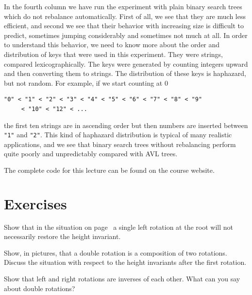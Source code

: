 In the fourth column we have run the experiment with plain binary
search trees which do not rebalance automatically.  First of all, we
see that they are much less efficient, and second we see that their
behavior with increasing size is difficult to predict, sometimes
jumping considerably and sometimes not much at all.  In order to
understand this behavior, we need to know more about the order and
distribution of keys that were used in this experiment.  They were
strings, compared lexicographically.  The keys were generated by
counting integers upward and then converting them to strings.  The
distribution of these keys is haphazard, but not random.  For example,
if we start counting at $0$
\begin{lstlisting}[language={[C0]C}]
"0" < "1" < "2" < "3" < "4" < "5" < "6" < "7" < "8" < "9"
     < "10" < "12" < ...
\end{lstlisting}
the first ten strings are in ascending order but then numbers
are inserted between \lstinline'"1"' and \lstinline'"2"'.  This kind of
haphazard distribution is typical of many realistic applications,
and we see that binary search trees without rebalancing perform
quite poorly and unpredictably compared with AVL trees.

\bigskip

The complete code for this lecture can be found on the course website.

\section{Exercises}
\label{sec:avl:exercises}

\begin{exercise}
\label{exc:left-not-restore}
Show that in the situation on page~\pageref{dia:RL} a single
left rotation at the root will not necessarily restore the
height invariant.
\end{exercise}

\begin{exercise}
\label{exc:double-rotation}
Show, in pictures, that a double rotation is a composition
of two rotations.  Discuss the situation with respect to the
height invariants after the first rotation.
\end{exercise}

\begin{exercise}
\label{exc:left-right}
Show that left and right rotations are inverses of each
other.  What can you say about double rotations?
\end{exercise}

